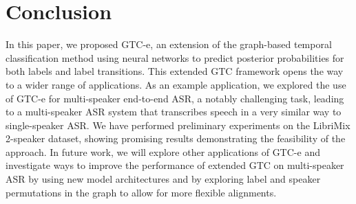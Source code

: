 \documentclass{article}
\begin{document}
\begin{table}[t]
    \centering
    \caption{WER(\%) for each speaker with GTC-e using beam search decoding.}
    \label{tab:beamsearch-ind}
    \vspace{-15pt}
\end{table}

\section{Conclusion}
\label{sec:conclusion}

In this paper, we proposed GTC-e, an extension of the graph-based temporal classification method using neural networks to predict posterior probabilities for both labels and label transitions. This extended GTC framework opens the way to a wider range of applications. 
As an example application, we explored the use of GTC-e for multi-speaker end-to-end ASR, 
a notably challenging task, leading to a multi-speaker ASR system that transcribes speech in a very similar way to single-speaker ASR. 
We have performed preliminary experiments on the LibriMix 2-speaker dataset, showing promising results demonstrating the feasibility of the approach. 
In future work, we will explore other applications of GTC-e and investigate ways to improve the performance of extended GTC on multi-speaker ASR by using new model architectures 
and by exploring label and speaker permutations in the graph to allow for more flexible alignments.



\balance


\end{document}
